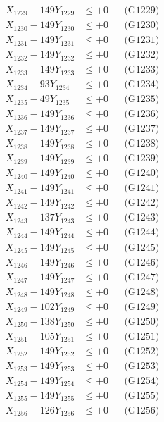 \documentclass[a4paper,10pt]{article}
\begin{document}
{\begin{align}
X_{1229} - 149Y_{1229} &\leq +0 && \text{(G1229)} \\
X_{1230} - 149Y_{1230} &\leq +0 && \text{(G1230)} \\
\allowbreak
X_{1231} - 149Y_{1231} &\leq +0 && \text{(G1231)} \\
X_{1232} - 149Y_{1232} &\leq +0 && \text{(G1232)} \\
X_{1233} - 149Y_{1233} &\leq +0 && \text{(G1233)} \\
X_{1234} - 93Y_{1234} &\leq +0 && \text{(G1234)} \\
X_{1235} - 49Y_{1235} &\leq +0 && \text{(G1235)} \\
X_{1236} - 149Y_{1236} &\leq +0 && \text{(G1236)} \\
X_{1237} - 149Y_{1237} &\leq +0 && \text{(G1237)} \\
X_{1238} - 149Y_{1238} &\leq +0 && \text{(G1238)} \\
X_{1239} - 149Y_{1239} &\leq +0 && \text{(G1239)} \\
X_{1240} - 149Y_{1240} &\leq +0 && \text{(G1240)} \\
\allowbreak
X_{1241} - 149Y_{1241} &\leq +0 && \text{(G1241)} \\
X_{1242} - 149Y_{1242} &\leq +0 && \text{(G1242)} \\
X_{1243} - 137Y_{1243} &\leq +0 && \text{(G1243)} \\
X_{1244} - 149Y_{1244} &\leq +0 && \text{(G1244)} \\
X_{1245} - 149Y_{1245} &\leq +0 && \text{(G1245)} \\
X_{1246} - 149Y_{1246} &\leq +0 && \text{(G1246)} \\
X_{1247} - 149Y_{1247} &\leq +0 && \text{(G1247)} \\
X_{1248} - 149Y_{1248} &\leq +0 && \text{(G1248)} \\
X_{1249} - 102Y_{1249} &\leq +0 && \text{(G1249)} \\
X_{1250} - 138Y_{1250} &\leq +0 && \text{(G1250)} \\
\allowbreak
X_{1251} - 105Y_{1251} &\leq +0 && \text{(G1251)} \\
X_{1252} - 149Y_{1252} &\leq +0 && \text{(G1252)} \\
X_{1253} - 149Y_{1253} &\leq +0 && \text{(G1253)} \\
X_{1254} - 149Y_{1254} &\leq +0 && \text{(G1254)} \\
X_{1255} - 149Y_{1255} &\leq +0 && \text{(G1255)} \\
X_{1256} - 126Y_{1256} &\leq +0 && \text{(G1256)} \\

\end{align}}
\end{document}
